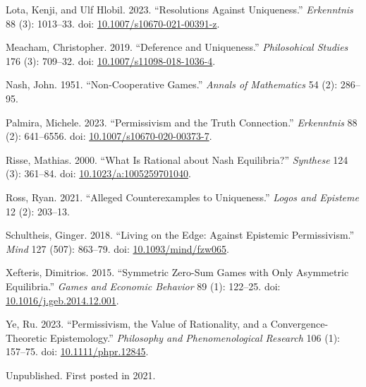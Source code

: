 \documentclass[
  10pt,
  letterpaper,
  DIV=11,
  numbers=noendperiod,
  twoside]{scrartcl}
\newlength{\cslhangindent}
\newenvironment{CSLReferences}[2] %
 {\begin{list}{}{%
  \setlength{\itemindent}{0pt}
  \setlength{\leftmargin}{0pt}
  \setlength{\parsep}{0pt}
  \ifodd #1
   \setlength{\leftmargin}{\cslhangindent}
   \setlength{\itemindent}{-1\cslhangindent}
  \fi
  \setlength{\itemsep}{#2\baselineskip}}}
 {\end{list}}
\begin{document}
\begin{CSLReferences}{1}{0}
Lota, Kenji, and Ulf Hlobil. 2023. {``Resolutions Against Uniqueness.''}
\emph{Erkenntnis} 88 (3): 1013--33. doi:
\href{https://doi.org/10.1007/s10670-021-00391-z}{10.1007/s10670-021-00391-z}.

Meacham, Christopher. 2019. {``Deference and Uniqueness.''}
\emph{Philosohical Studies} 176 (3): 709--32. doi:
\href{https://doi.org/10.1007/s11098-018-1036-4}{10.1007/s11098-018-1036-4}.

Nash, John. 1951. {``Non-Cooperative Games.''} \emph{Annals of
Mathematics} 54 (2): 286--95.

Palmira, Michele. 2023. {``Permissivism and the Truth Connection.''}
\emph{Erkenntnis} 88 (2): 641--6556. doi:
\href{https://doi.org/10.1007/s10670-020-00373-7}{10.1007/s10670-020-00373-7}.

Risse, Mathias. 2000. {``What Is Rational about Nash Equilibria?''}
\emph{Synthese} 124 (3): 361--84. doi:
\href{https://doi.org/10.1023/a:1005259701040}{10.1023/a:1005259701040}.

Ross, Ryan. 2021. {``Alleged Counterexamples to Uniqueness.''}
\emph{Logos and Episteme} 12 (2): 203--13.

Schultheis, Ginger. 2018. {``Living on the Edge: Against Epistemic
Permissivism.''} \emph{Mind} 127 (507): 863--79. doi:
\href{https://doi.org/10.1093/mind/fzw065}{10.1093/mind/fzw065}.

Xefteris, Dimitrios. 2015. {``Symmetric Zero-Sum Games with Only
Asymmetric Equilibria.''} \emph{Games and Economic Behavior} 89 (1):
122--25. doi:
\href{https://doi.org/10.1016/j.geb.2014.12.001}{10.1016/j.geb.2014.12.001}.

Ye, Ru. 2023. {``Permissivism, the Value of Rationality, and a
Convergence-Theoretic Epistemology.''} \emph{Philosophy and
Phenomenological Research} 106 (1): 157--75. doi:
\href{https://doi.org/10.1111/phpr.12845}{10.1111/phpr.12845}.

\end{CSLReferences}



\noindent Unpublished. First posted in 2021.
\end{document}
